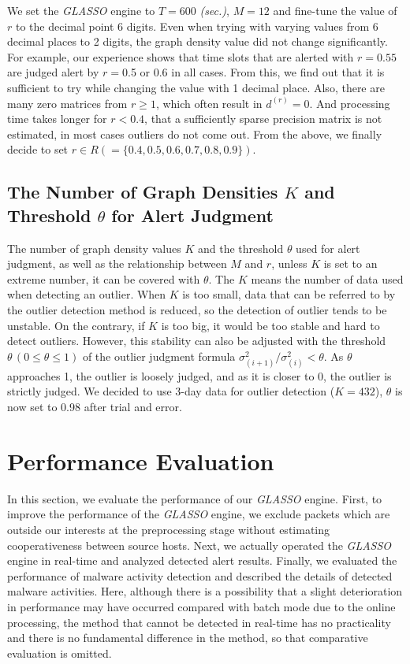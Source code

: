 \documentclass[conference]{IEEEtran}
\begin{document}
We set the {\it GLASSO} engine to $T=600$ {\it (sec.)}, $M=12$ and fine-tune the value of $r$ to the decimal point 6 digits.
Even when trying with varying values from 6 decimal places to 2 digits, the graph density value did not change significantly.
For example, our experience shows that time slots that are alerted with $r=0.55$ are judged alert by $r=$0.5 or 0.6 in all cases.
From this, we find out that it is sufficient to try while changing the value with 1 decimal place.
Also, there are many zero matrices from $r\geq 1$, which often result in $d^{(r)}=0$.
And processing time takes longer for $r < 0.4$, that a sufficiently sparse precision matrix is not estimated, in most cases outliers do not come out.
From the above, we finally decide to set $r \in R ( = \{0.4, 0.5, 0.6, 0.7, 0.8, 0.9\})$.



\subsection{The Number of Graph Densities $K$ and Threshold $\theta$ for Alert Judgment}
The number of graph density values $K$ and the threshold $\theta$ used for alert judgment, as well as the relationship between $M$ and $r$, unless $K$ is set to an extreme number, it can be covered with $\theta$.
The $K$ means the number of data used when detecting an outlier.
When $K$ is too small, data that can be referred to by the outlier detection method is reduced, so the detection of outlier tends to be unstable.
On the contrary, if $K$ is too big, it would be too stable and hard to detect outliers.
However, this stability can also be adjusted with the threshold $\theta \, (0\leq \theta \leq 1)$ of the outlier judgment formula $\sigma^{2}_{(i+1)}/\sigma^{2}_{(i)}<\theta$.
As $\theta$ approaches 1, the outlier is loosely judged, and as it is closer to 0, the outlier is strictly judged.
We decided to use 3-day data for outlier detection ($K=432$), $\theta$ is now set to 0.98 after trial and error.



\section{Performance Evaluation}
In this section, we evaluate the performance of our {\it GLASSO} engine.
First, to improve the performance of the {\it GLASSO} engine, we exclude packets which are outside our interests at the preprocessing stage without estimating cooperativeness between source hosts.
Next, we actually operated the {\it GLASSO} engine in real-time and analyzed detected alert results.
Finally, we evaluated the performance of malware activity detection and described the details of detected malware activities.
Here, although there is a possibility that a slight deterioration in performance may have occurred compared with batch mode due to the online processing, the method that cannot be detected in real-time has no practicality and there is no fundamental difference in the method, so that comparative evaluation is omitted.
\end{document}
